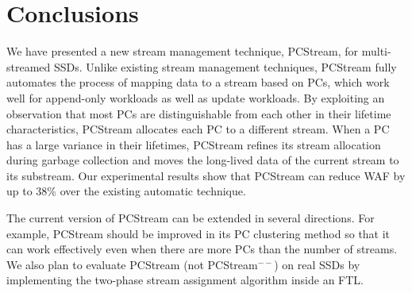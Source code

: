 \section{Conclusions}
We have presented a new stream management technique, {\sf PCStream}, for multi-streamed SSDs.  
Unlike existing stream management techniques, {\sf PCStream} fully automates 
the process of mapping data to a stream based on PCs, 
which work well for append-only workloads as well as update workloads.  
By exploiting an observation that most PCs are distinguishable from each other 
in their lifetime characteristics, {\sf PCStream} allocates each PC to a different stream.  
When a PC has a large variance in their lifetimes, {\sf PCStream} refines its stream allocation 
during garbage collection and moves the long-lived data of the current stream to its substream.  
Our experimental results show that {\sf PCStream} can reduce WAF by up to 38\% over the existing
automatic technique.

The current version of {\sf PCStream} can be extended in several directions.  
For example, {\sf PCStream} should be improved in its PC clustering method 
so that it can work effectively even when there are more PCs than the number of streams.  
We also plan to evaluate {\sf PCStream} (not {\sf PCStream}$^{--}$) on real SSDs 
by implementing the two-phase stream assignment algorithm inside an FTL.


